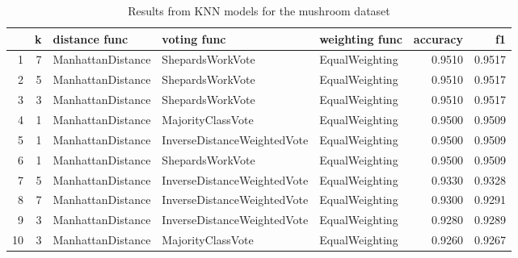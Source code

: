 \begin{table}
\caption{Results from KNN models for the mushroom dataset}
\label{tab:knn_results_mushroom}
\begin{tabular}{rrlllrr}
\toprule
 & k & distance func & voting func & weighting func & accuracy & f1 \\
\midrule
1 & 7 & ManhattanDistance & ShepardsWorkVote & EqualWeighting & 0.9510 & 0.9517 \\
2 & 5 & ManhattanDistance & ShepardsWorkVote & EqualWeighting & 0.9510 & 0.9517 \\
3 & 3 & ManhattanDistance & ShepardsWorkVote & EqualWeighting & 0.9510 & 0.9517 \\
4 & 1 & ManhattanDistance & MajorityClassVote & EqualWeighting & 0.9500 & 0.9509 \\
5 & 1 & ManhattanDistance & InverseDistanceWeightedVote & EqualWeighting & 0.9500 & 0.9509 \\
6 & 1 & ManhattanDistance & ShepardsWorkVote & EqualWeighting & 0.9500 & 0.9509 \\
7 & 5 & ManhattanDistance & InverseDistanceWeightedVote & EqualWeighting & 0.9330 & 0.9328 \\
8 & 7 & ManhattanDistance & InverseDistanceWeightedVote & EqualWeighting & 0.9300 & 0.9291 \\
9 & 3 & ManhattanDistance & InverseDistanceWeightedVote & EqualWeighting & 0.9280 & 0.9289 \\
10 & 3 & ManhattanDistance & MajorityClassVote & EqualWeighting & 0.9260 & 0.9267 \\
\bottomrule
\end{tabular}
\end{table}
